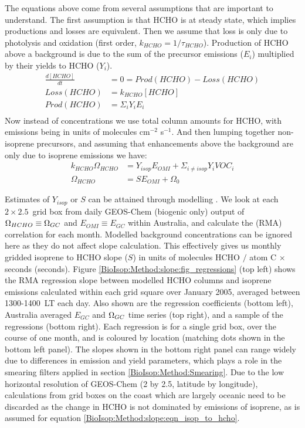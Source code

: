     The equations above come from several assumptions that are important to understand.
    The first assumption is that HCHO %
    is at steady state, which implies productions and losses are equivalent.
    Then we assume that loss is only due to photolysis and oxidation (first order, $k_{HCHO} = 1/\tau_{HCHO}$).
    Production of HCHO above a background is due to the sum of the precursor emissions ($E_i$) multiplied by their yields to HCHO ($Y_i$).
    \begin{eqnarray*}
      \frac{d [ HCHO ] }{dt} & = 0 = Prod(HCHO) - Loss(HCHO) \\
      Loss(HCHO)  & = k_{HCHO} [ HCHO ] \\
      Prod(HCHO)  & = \Sigma_i Y_i E_i  \\
    \end{eqnarray*}
    Now instead of concentrations we use total column amounts for HCHO, with emissions being in units of molecules cm$^{-2}$ s$^{-1}$.
    And then lumping together non-isoprene precursors, and assuming that enhancements above the background are only due to isoprene emissions we have: 
    \begin{eqnarray*}
    k_{HCHO} \Omega_{HCHO} & = Y_{isop} E_{OMI} + \Sigma_{i \ne isop} Y_{i} VOC_{i} \\
    \Omega_{HCHO} & = S E_{OMI} + \Omega_{0}
    \end{eqnarray*}
    
    
    Estimates of $Y_{isop}$ or $S$ can be attained through modelling \parencite[e.g.][]{Millet2006}.
    We look at each $2\times2.5$~\degr grid box from daily GEOS-Chem (biogenic only) output of $\Omega_{HCHO} \equiv \Omega_{GC}$ and $E_{OMI} \equiv E_{GC}$ within Australia, and calculate the (RMA) correlation for each month.
    Modelled background concentrations can be ignored here as they do not affect slope calculation.
    This effectively gives us monthly gridded isoprene to HCHO slope ($S$) in units of molecules HCHO $/$ atom C $\times$ seconds (seconds).
    Figure \ref{BioIsop:Method:slope:fig_regressions} (top left) shows the RMA regression slope between modelled HCHO columns and isoprene emissions calculated within each grid square over January 2005, averaged between 1300-1400~LT each day.
    Also shown are the regression coefficients (bottom left), Australia averaged $E_{GC}$ and $\Omega_{GC}$ time series (top right), and a sample of the regressions (bottom right).
    Each regression is for a single grid box, over the course of one month, and is coloured by location (matching dots shown in the bottom left panel).
    The slopes shown in the bottom right panel can range widely due to differences in emission and yield parameters, which plays a role in the smearing filters applied in section \ref{BioIsop:Method:Smearing}.
    Due to the low horizontal resolution of GEOS-Chem (2 by 2.5\degr, latitude by longitude), calculations from grid boxes on the coast which are largely oceanic need to be discarded as the change in HCHO is not dominated by emissions of isoprene, as is assumed for equation \ref{BioIsop:Method:slope:eqn_isop_to_hcho}.
    
